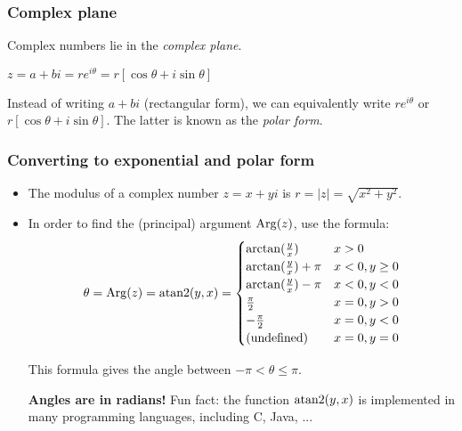 \begin{frame}
\frametitle{Complex plane}

Complex numbers lie in the \textit{complex plane}.


${\boxed{\boxed{z=a+bi=re^{i\theta}=r[\cos\theta+i\sin\theta]}}}$



\pause Instead of writing $a+bi$ (rectangular form), we can equivalently write $re^{i\theta}$ or $r[\cos\theta+i\sin\theta]$. The latter is known as the \textit{polar form}.
\end{frame}

\begin{frame}
\frametitle{Converting to exponential and polar form}
\begin{itemize}
\item The modulus of a complex number $z=x+yi$ is $\boxed{r=|z|=\sqrt{x^2+y^2}}$.

\item\pause In order to find the (principal) argument $\operatorname{Arg}(z)$, use the formula:
\[{\theta=\operatorname{Arg}(z)=\operatorname{atan2}(y,x)=\begin{cases}
\arctan(\frac{y}{x}) &x>0\\
\arctan(\frac{y}{x})+\pi &x<0, y\geq0\\
\arctan(\frac{y}{x})-\pi &x<0, y<0 \\
\frac{\pi}{2}&x=0, y>0\\
-\frac{\pi}{2} &x=0, y<0\\
\text{(undefined)} &x=0, y=0
\end{cases}}\]

This formula gives the angle between $-\pi<\theta\leq\pi$.

\pause\textbf{Angles are in radians!} Fun fact: the function $\operatorname{atan2}(y,x)$ is implemented in many programming languages, including C, Java, ...

\end{itemize}
\end{frame}

